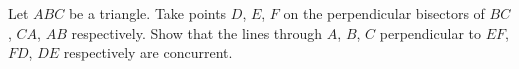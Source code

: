 Let $ABC$ be a triangle. Take points $D$,  $E$,  $F$ on the perpendicular bisectors of $BC$,  $CA$,  $AB$ respectively. Show that the lines through $A$,  $B$,  $C$ perpendicular to $EF$,  $FD$,  $DE$ respectively are concurrent.
